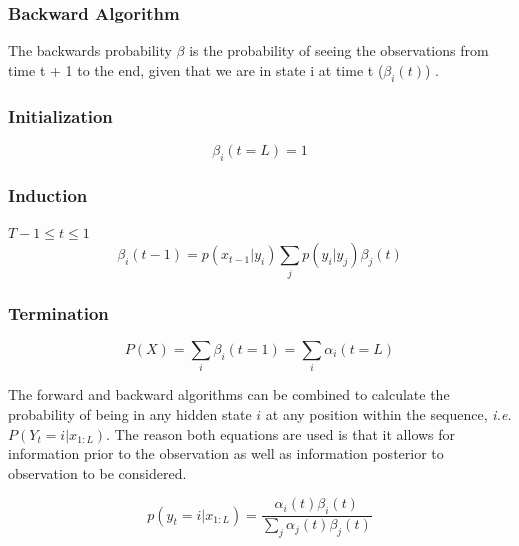 \subsubsection{Backward Algorithm}
The backwards probability $\beta$ is the probability of seeing the observations from time t + 1 to the end, given
that we are in state i at time t ($\beta_i(t)$) \cite{Rabiner1989ARecognition}.

\subsubsection{Initialization}
\begin{equation}
    \beta_i(t=L) = 1
\label{eq:bwdinit}
\end{equation}

\subsubsection{Induction}
$T-1\leq t\leq 1$
\begin{equation}
\beta_i(t-1) =p(x_{t-1}|y_i)\sum_{j}{p(y_i|y_j)\beta_j(t)}
\label{eq:bwdinduc}
\end{equation}

\subsubsection{Termination}
\begin{equation}
    P(X)= \sum_i{\beta_i(t=1)} = \sum_i{\alpha_i(t=L)}
\label{eq:bwdterm}
\end{equation}

The forward and backward algorithms can be combined to calculate the probability of being in any hidden state $i$ at any position within the sequence, \emph{i.e.} $P(Y_t=i|x_{1:L})$. The reason both equations are used is that it allows for information prior to the observation as well as information posterior to observation to be considered. 

\begin{equation}
p(y_t=i|x_{1:L}) = \frac{\alpha_i(t)\beta_i(t)}{\sum_j{\alpha_j(t)\beta_j(t)}}
\label{eq:fwdbwd}
\end{equation}

